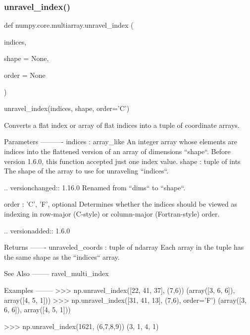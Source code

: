 \subsubsection{\texorpdfstring{unravel\+\_\+index()}{unravel\_index()}}
{\footnotesize\ttfamily def numpy.\+core.\+multiarray.\+unravel\+\_\+index (\begin{DoxyParamCaption}\item[{}]{indices,  }\item[{}]{shape = {\ttfamily None},  }\item[{}]{order = {\ttfamily None} }\end{DoxyParamCaption})}

\begin{DoxyVerb}unravel_index(indices, shape, order='C')

Converts a flat index or array of flat indices into a tuple
of coordinate arrays.

Parameters
----------
indices : array_like
    An integer array whose elements are indices into the flattened
    version of an array of dimensions ``shape``. Before version 1.6.0,
    this function accepted just one index value.
shape : tuple of ints
    The shape of the array to use for unraveling ``indices``.

    .. versionchanged:: 1.16.0
        Renamed from ``dims`` to ``shape``.

order : {'C', 'F'}, optional
    Determines whether the indices should be viewed as indexing in
    row-major (C-style) or column-major (Fortran-style) order.

    .. versionadded:: 1.6.0

Returns
-------
unraveled_coords : tuple of ndarray
    Each array in the tuple has the same shape as the ``indices``
    array.

See Also
--------
ravel_multi_index

Examples
--------
>>> np.unravel_index([22, 41, 37], (7,6))
(array([3, 6, 6]), array([4, 5, 1]))
>>> np.unravel_index([31, 41, 13], (7,6), order='F')
(array([3, 6, 6]), array([4, 5, 1]))

>>> np.unravel_index(1621, (6,7,8,9))
(3, 1, 4, 1)\end{DoxyVerb}
 \mbox{\label{namespacenumpy_1_1core_1_1multiarray_ad7fcdff2015b8369807bbde3b5a10784}} 
